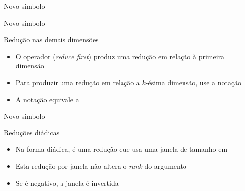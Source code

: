 \begin{frame}[fragile]{Novo símbolo}


\end{frame}

\begin{frame}[fragile]{Novo símbolo}


\end{frame}


\begin{frame}[fragile]{Redução nas demais dimensões}

    \begin{itemize}
        \item  O operador  (\textit{reduce first}) produz uma redução em relação à primeira dimensão
        \pause
        
        \item Para produzir uma redução em relação a $k$-ésima dimensão, use a notação 
        \pause

        \item A notação  equivale a 
    \end{itemize}

\end{frame}

\begin{frame}[fragile]{Novo símbolo}


\end{frame}

\begin{frame}[fragile]{Reduções diádicas}

    \begin{itemize}
        \item Na forma diádica,  é uma redução que usa uma janela de tamanho
             em 
        \pause

        \item Esta redução por janela não altera o \textit{rank} do argumento
        \pause

        \item Se  é negativo, a janela é invertida    
    \end{itemize}

\end{frame}

